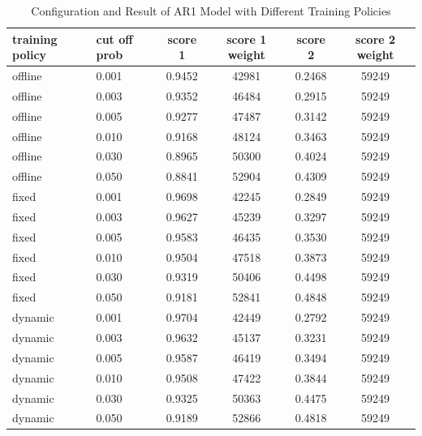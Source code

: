 \documentclass{article}
\begin{document}
\begin{table}[htbp]
  \begin{center}
    \caption{Configuration and Result of AR1 Model with Different Training Policies}
    \label{tab:tab1.5.1}
    \begin{tabular}{l|l|*{4}{c}}
      \textbf{training policy} & \textbf{cut off prob} & \textbf{score 1} & \textbf{score 1 weight} & \textbf{score 2} & \textbf{score 2 weight} \\
      \hline
      offline & 0.001 & 0.9452 & 42981 & 0.2468 & 59249\\
      offline & 0.003 & 0.9352 & 46484 & 0.2915 & 59249\\
      offline & 0.005 & 0.9277 & 47487 & 0.3142 & 59249\\
      offline & 0.010 & 0.9168 & 48124 & 0.3463 & 59249\\
      offline & 0.030 & 0.8965 & 50300 & 0.4024 & 59249\\
      offline & 0.050 & 0.8841 & 52904 & 0.4309 & 59249\\
      fixed & 0.001 & 0.9698 & 42245 & 0.2849 & 59249\\
      fixed & 0.003 & 0.9627 & 45239 & 0.3297 & 59249\\
      fixed & 0.005 & 0.9583 & 46435 & 0.3530 & 59249\\
      fixed & 0.010 & 0.9504 & 47518 & 0.3873 & 59249\\
      fixed & 0.030 & 0.9319 & 50406 & 0.4498 & 59249\\
      fixed & 0.050 & 0.9181 & 52841 & 0.4848 & 59249\\
      dynamic & 0.001 & 0.9704 & 42449 & 0.2792 & 59249\\
      dynamic & 0.003 & 0.9632 & 45137 & 0.3231 & 59249\\
      dynamic & 0.005 & 0.9587 & 46419 & 0.3494 & 59249\\
      dynamic & 0.010 & 0.9508 & 47422 & 0.3844 & 59249\\
      dynamic & 0.030 & 0.9325 & 50363 & 0.4475 & 59249\\
      dynamic & 0.050 & 0.9189 & 52866 & 0.4818 & 59249\\
    \end{tabular}
  \end{center}
\end{table}
\end{document}
